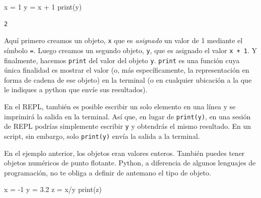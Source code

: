 \documentclass[
  letterpaper,
]{scrbook}
\newenvironment{Shaded}{\begin{snugshade}}{\end{snugshade}}
\newcommand{\BuiltInTok}[1]{\textcolor[rgb]{0.00,0.23,0.31}{#1}}
\newcommand{\DecValTok}[1]{\textcolor[rgb]{0.68,0.00,0.00}{#1}}
\newcommand{\FloatTok}[1]{\textcolor[rgb]{0.68,0.00,0.00}{#1}}
\newcommand{\NormalTok}[1]{\textcolor[rgb]{0.00,0.23,0.31}{#1}}
\newcommand{\OperatorTok}[1]{\textcolor[rgb]{0.37,0.37,0.37}{#1}}
\begin{document}
\begin{Shaded}
\begin{Highlighting}[]
\NormalTok{x }\OperatorTok{=} \DecValTok{1}
\NormalTok{y }\OperatorTok{=}\NormalTok{ x }\OperatorTok{+} \DecValTok{1}
\BuiltInTok{print}\NormalTok{(y)}
\end{Highlighting}
\end{Shaded}

\begin{verbatim}
2
\end{verbatim}

Aquí primero creamos un objeto, \texttt{x} que es \emph{asignado} un
valor de 1 mediante el símbolo \texttt{=}. Luego creamos un segundo
objeto, \texttt{y}, que es asignado el valor \texttt{x\ +\ 1}. Y
finalmente, hacemos \texttt{print} del valor del objeto \texttt{y}.
\texttt{print} es una función cuya única finalidad es mostrar el valor
(o, más específicamente, la representación en forma de cadena de ese
objeto) en la terminal (o en cualquier ubicación a la que le indiques a
python que envíe sus resultados).

\begin{tcolorbox}[enhanced jigsaw, colbacktitle=quarto-callout-note-color!10!white, arc=.35mm, opacityback=0, colframe=quarto-callout-note-color-frame, colback=white, left=2mm, leftrule=.75mm, title={Note}, bottomtitle=1mm, rightrule=.15mm, toptitle=1mm, coltitle=black, titlerule=0mm, toprule=.15mm, bottomrule=.15mm, opacitybacktitle=0.6, breakable]

En el REPL, también es posible escribir un solo elemento en una línea y
se imprimirá la salida en la terminal. Así que, en lugar de
\texttt{print(y)}, en una sesión de REPL podrías simplemente escribir
\texttt{y} y obtendrás el mismo resultado. En un script, sin embargo,
solo \texttt{print(y)} envía la salida a la terminal.

\end{tcolorbox}

En el ejemplo anterior, los objetos eran valores enteros. También puedes
tener objetos numéricos de punto flotante. Python, a diferencia de
algunos lenguajes de programación, no te obliga a definir de antemano el
tipo de objeto.

\begin{Shaded}
\begin{Highlighting}[]
\NormalTok{x }\OperatorTok{=} \OperatorTok{{-}}\DecValTok{1}
\NormalTok{y }\OperatorTok{=} \FloatTok{3.2}
\NormalTok{z }\OperatorTok{=}\NormalTok{ x}\OperatorTok{/}\NormalTok{y}
\BuiltInTok{print}\NormalTok{(z)}
\end{Highlighting}
\end{Shaded}
\end{document}
